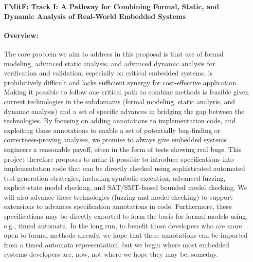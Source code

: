 \documentclass{article}
\begin{document}
\begin{center}
{\Large\sf\textbf{FMitF: Track I: A Pathway for Combining Formal, Static, and
    Dynamic Analysis of Real-World Embedded Systems}}
\end{center}

\paragraph{Overview:} The core problem we aim to address in this proposal is that use of formal modeling, advanced static analysis, and advanced dynamic analysis for verification and validation, especially on critical embedded systems, is prohibitively difficult and lacks sufficient synergy for cost-effective application. Making it possible to follow one critical path to combine methods is feasible given current technologies in the subdomains (formal modeling, static analysis, and dynamic analysis) and a set of specific advances in bridging the gap between the technologies. By focusing on adding annotations to implementation code, and exploiting those annotations to enable a set of potentially bug-finding or correctness-proving analyses, we promise to always give embedded systems engineers a reasonable payoff, often in the form of tests showing real bugs. This project therefore proposes to make it possible to introduce specifications into implementation code that can be directly checked using sophisticated automated test generation strategies, including symbolic execution, advanced fuzzing, explicit-state model checking, and SAT/SMT-based bounded model checking. We will also advance these technologies (fuzzing and model checking) to support extensions to advances specification annotations in code. Furthermore, these specifications may be directly exported to form the basis for formal models using, e.g., timed automata. In the long run, to benefit those developers who are more open to formal methods already, we hope that these annotations can be imported from a timed automata representation, but we begin where most embedded systems developers are, now, not where we hope they may be, someday.
\end{document}
